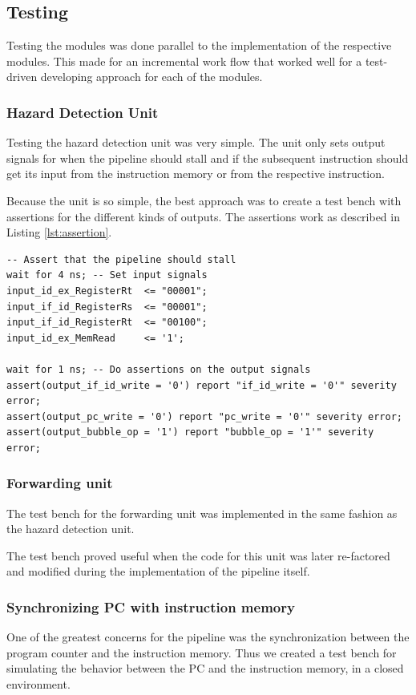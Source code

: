 \subsection{Testing}
Testing the modules was done parallel to the implementation of the
respective modules. This made for an incremental work flow that
worked well for a test-driven developing approach for each of the
modules.

\subsubsection{Hazard Detection Unit}
Testing the hazard detection unit was very simple. The unit only
sets output signals for when the pipeline should stall and
if the subsequent instruction should get its input from the 
instruction memory or from the respective instruction.

Because the unit is so simple, the best approach was to create
a test bench with assertions for the different kinds of outputs.
The assertions work as described in Listing \ref{lst:assertion}.

\begin{lstlisting}[caption={Code snippet from the test 
    bench for the hazard detection unit}, label={lst:assertion}]
-- Assert that the pipeline should stall
wait for 4 ns; -- Set input signals
input_id_ex_RegisterRt  <= "00001";
input_if_id_RegisterRs  <= "00001";
input_if_id_RegisterRt  <= "00100";
input_id_ex_MemRead     <= '1';

wait for 1 ns; -- Do assertions on the output signals
assert(output_if_id_write = '0') report "if_id_write = '0'" severity error;
assert(output_pc_write = '0') report "pc_write = '0'" severity error;
assert(output_bubble_op = '1') report "bubble_op = '1'" severity error;
\end{lstlisting}

\subsubsection{Forwarding unit}
The test bench for the forwarding unit was implemented in
the same fashion as the hazard detection unit. 

The test bench proved useful when the code for this
unit was later re-factored and modified during the implementation of the
pipeline itself.

\subsubsection{Synchronizing PC with instruction memory}
One of the greatest concerns for the pipeline was the synchronization 
between the program counter and the instruction memory. Thus we
created a test bench for simulating the behavior between the PC and the
instruction memory, in a closed environment.

